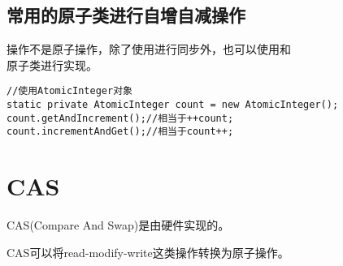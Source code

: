 \documentclass[a4paper]{report}
\begin{document}
\subsection{常用的原子类进行自增自减操作}
操作不是原子操作，除了使用进行同步外，也可以使用和\\ 原子类进行实现。
\begin{lstlisting}
//使用AtomicInteger对象
static private AtomicInteger count = new AtomicInteger();
count.getAndIncrement();//相当于++count;
count.incrementAndGet();//相当于count++;
\end{lstlisting}
\section{CAS}
CAS(Compare And Swap)是由硬件实现的。

CAS可以将read-modify-write这类操作转换为原子操作。
\end{document}
